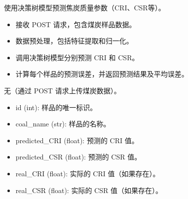 \documentclass[a4paper,12pt,english]{sphinxmanual}
\begin{document}

\begin{fulllineitems}
\label{\detokenize{api/login:login.getCokeQualityResultAIDecisionTree}}
\pysigstartsignatures
{}
\pysigstopsignatures
\sphinxAtStartPar
使用决策树模型预测焦炭质量参数（CRI、CSR等）。
\begin{description}
\begin{itemize}
\item {} 
\sphinxAtStartPar
接收 POST 请求，包含煤炭样品数据。

\item {} 
\sphinxAtStartPar
数据预处理，包括特征提取和归一化。

\item {} 
\sphinxAtStartPar
调用决策树模型分别预测 CRI 和 CSR。

\item {} 
\sphinxAtStartPar
计算每个样品的预测误差，并返回预测结果及平均误差。

\end{itemize}

\sphinxAtStartPar
无（通过 POST 请求上传煤炭数据）。

\begin{description}
\begin{itemize}
\item {} 
\sphinxAtStartPar
id (int): 样品的唯一标识。

\item {} 
\sphinxAtStartPar
coal\_name (str): 样品的名称。

\item {} 
\sphinxAtStartPar
predicted\_CRI (float): 预测的 CRI 值。

\item {} 
\sphinxAtStartPar
predicted\_CSR (float): 预测的 CSR 值。

\item {} 
\sphinxAtStartPar
real\_CRI (float): 实际的 CRI 值（如果存在）。

\item {} 
\sphinxAtStartPar
real\_CSR (float): 实际的 CSR 值（如果存在）。


\end{itemize}
\end{description}
\end{description}
\end{fulllineitems}
\end{document}
